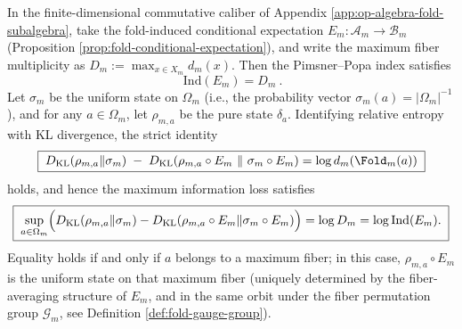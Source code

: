 \begin{proposition}\label{prop:op-algebra-index-extremal-entropy-loss-maxfiber}
In the finite-dimensional commutative caliber of Appendix \ref{app:op-algebra-fold-subalgebra}, take the fold-induced conditional expectation \(E_m:\mathcal{A}_m\to\mathcal{B}_m\) (Proposition \ref{prop:fold-conditional-expectation}), and write the maximum fiber multiplicity as \(D_m:=\max_{x\in X_m}d_m(x)\).
Then the Pimsner--Popa index satisfies
\[
\boxed{\ \mathrm{Ind}(E_m)=D_m\ }.
\]
Let \(\sigma_m\) be the uniform state on \(\Omega_m\) (i.e., the probability vector \(\sigma_m(a)=|\Omega_m|^{-1}\)), and for any \(a\in\Omega_m\), let \(\rho_{m,a}\) be the pure state \(\delta_a\).
Identifying relative entropy with KL divergence, the strict identity
\[
\boxed{\;
D_{\mathrm{KL}}(\rho_{m,a}\|\sigma_m)\;-\;D_{\mathrm{KL}}(\rho_{m,a}\circ E_m\ \|\ \sigma_m\circ E_m)
=\log d_m(\Fold_m(a))\;}
\]
holds, and hence the maximum information loss satisfies
\[
\boxed{\;
\sup_{a\in\Omega_m}\Bigl(D_{\mathrm{KL}}(\rho_{m,a}\|\sigma_m)-D_{\mathrm{KL}}(\rho_{m,a}\circ E_m\|\sigma_m\circ E_m)\Bigr)
=\log D_m=\log\mathrm{Ind}(E_m).\;}
\]
Equality holds if and only if \(a\) belongs to a maximum fiber; in this case, \(\rho_{m,a}\circ E_m\) is the uniform state on that maximum fiber (uniquely determined by the fiber-averaging structure of \(E_m\), and in the same orbit under the fiber permutation group \(\mathcal{G}_m\), see Definition \ref{def:fold-gauge-group}).
\end{proposition}
